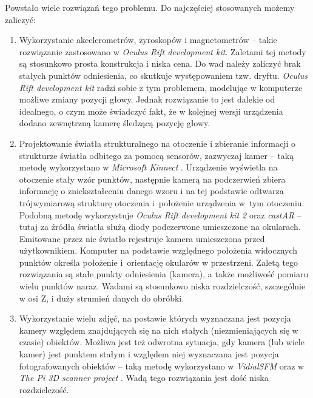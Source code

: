 Powstało wiele rozwiązań tego problemu. Do najczęściej stosowanych możemy zaliczyć:
\begin{enumerate}
 \item 
 Wykorzystanie akcelerometrów, żyroskopów i magnetometrów -- 
takie rozwiązanie zastosowano w \textit{Oculus Rift development kit}. Zaletami tej metody są stosunkowo
prosta konstrukcja i niska cena.
Do wad należy zaliczyć brak stałych punktów odniesienia, co skutkuje występowaniem tzw. dryftu.
\textit{Oculus Rift development kit} radzi sobie z tym problemem, modelując w komputerze możliwe zmiany pozycji głowy.
Jednak rozwiązanie to jest dalekie od idealnego, o czym może świadczyć fakt, że w kolejnej wersji 
urządzenia dodano zewnętrzną kamerę śledzącą pozycję głowy.

\item \label{itm:second_method}
 Projektowanie światła strukturalnego na otoczenie i zbieranie informacji o strukturze 
 światła odbitego za pomocą sensorów, zazwyczaj kamer -- 
 taką metodę wykorzystano w \textit{Microsoft Kinnect} \cite{bib:MicrosoftKinect}.
 Urządzenie wyświetla na otoczenie stały wzór punktów, następnie kamerą na podczerwień
 zbiera informację o zniekształceniu danego wzoru i na tej podstawie odtwarza  
 trójwymiarową strukturę otoczenia i~położenie urządzenia w~tym otoczeniu.
 Podobną metodę wykorzystuje \textit{Oculus Rift development kit 2} \cite{bib:OculusRiftDK2} oraz 
 \textit{castAR} \cite{bib:castAR} -- tutaj za źródła światła służą diody podczerwone umieszczone na okularach.
 Emitowane przez nie światło rejestruje kamera umieszczona przed użytkownikiem.
 Komputer na podstawie względnego położenia widocznych punktów określa położenie i~orientację
 okularów w przestrzeni.
 Zaletą tego rozwiązania są stałe punkty odniesienia (kamera), a także możliwość pomiaru wielu punktów naraz.
 Wadami są stosunkowo niska rozdzielczość, szczególnie w osi Z, i duży strumień danych do obróbki.

\item
 Wykorzystanie wielu zdjęć, na postawie których 
 wyznaczana jest pozycja kamery względem znajdujących się na nich  stałych (niezmieniających się w czasie) obiektów. 
 Możliwa jest też odwrotna sytuacja, gdy  
  kamera (lub wiele kamer) jest punktem stałym i względem niej wyznaczana jest pozycja fotografowanych obiektów --   
 taką metodę wykorzystano w \textit{VidialSFM} \cite{bib:VisualSFM} oraz w \textit{The Pi 3D scanner project} \cite{bib:pi3dscan}. 
 Wadą tego rozwiązania jest dość niska rozdzielczość.
 

\end{enumerate}
